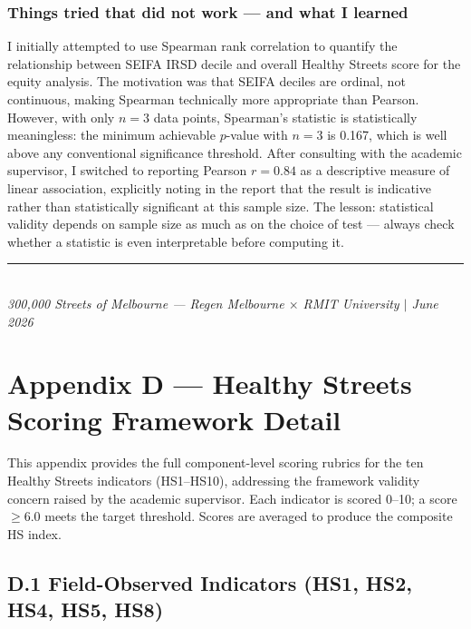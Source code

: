 \documentclass[11pt,a4paper]{article}
\begin{document}
\subsubsection*{Things tried that did not work — and what I learned}
I initially attempted to use Spearman rank correlation to quantify the relationship between SEIFA IRSD decile and overall Healthy Streets score for the equity analysis. The motivation was that SEIFA deciles are ordinal, not continuous, making Spearman technically more appropriate than Pearson. However, with only $n=3$ data points, Spearman's statistic is statistically meaningless: the minimum achievable $p$-value with $n=3$ is 0.167, which is well above any conventional significance threshold. After consulting with the academic supervisor, I switched to reporting Pearson $r = 0.84$ as a descriptive measure of linear association, explicitly noting in the report that the result is indicative rather than statistically significant at this sample size. The lesson: statistical validity depends on sample size as much as on the choice of test — always check whether a statistic is even interpretable before computing it.

\vfill
\begin{center}
\rule{0.5\textwidth}{0.4pt}\\[0.4em]
{\small\itshape 300,000 Streets of Melbourne --- Regen Melbourne $\times$ RMIT University $\mid$ June 2026}
\end{center}

\newpage
\section*{Appendix D — Healthy Streets Scoring Framework Detail}

This appendix provides the full component-level scoring rubrics for the ten Healthy Streets indicators (HS1--HS10), addressing the framework validity concern raised by the academic supervisor. Each indicator is scored 0--10; a score $\geq 6.0$ meets the target threshold. Scores are averaged to produce the composite HS index.

\subsection*{D.1 Field-Observed Indicators (HS1, HS2, HS4, HS5, HS8)}
\end{document}
